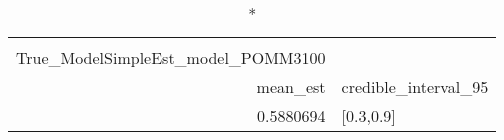\begin{longtable}{rl}
\caption*{
{\large alphasummarytable} \\ 
{\small True\_ModelSimpleEst\_model\_POMM3100}
} \\ 
\toprule
mean\_est & credible\_interval\_95 \\ 
\midrule
0.5880694 & [0.3,0.9] \\ 
\bottomrule
\end{longtable}

